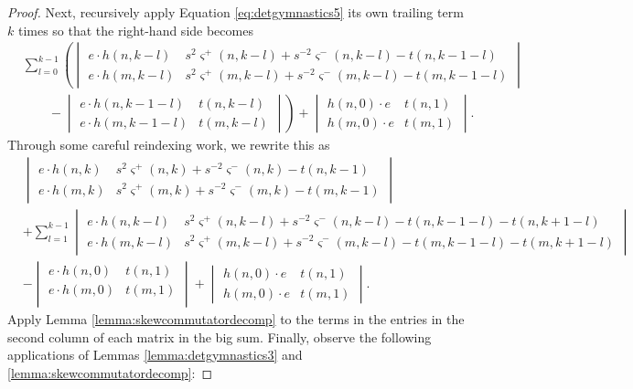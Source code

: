 \begin{proof}
Next, recursively apply Equation \ref{eq:detgymnastics5} its own trailing term $k$ times so that the right-hand side becomes
\begin{align*}
&\sum_{l=0}^{k-1} \left(
\begin{vmatrix}
e \cdot h(n, k-l) & s^2 \varsigma^+ (n, k-l) + s^{-2} \varsigma^- (n, k-l) - t(n, k-1-l) \\
e \cdot h(m, k-l) & s^2 \varsigma^+ (m, k-l) + s^{-2} \varsigma^- (m, k-l) - t(m, k-1-l)
\end{vmatrix} \right. \\
& \left. \qquad -
\begin{vmatrix}
e \cdot h(n, k-1-l) & t(n, k-l) \\
e \cdot h(m, k-1-l) & t(m, k-l)
\end{vmatrix} \right)
+
\begin{vmatrix}
h(n, 0) \cdot e & t(n, 1) \\
h(m, 0) \cdot e & t(m, 1)
\end{vmatrix}.
\end{align*}
Through some careful reindexing work, we rewrite this as
\begin{align*}
&\begin{vmatrix}
e \cdot h(n, k) & s^2 \varsigma^+ (n, k) + s^{-2} \varsigma^- (n, k) - t(n, k-1) \\
e \cdot h(m, k) & s^2 \varsigma^+ (m, k) + s^{-2} \varsigma^- (m, k) - t(m, k-1)
\end{vmatrix}\\
&+
\sum_{l=1}^{k-1}
\begin{vmatrix}
e \cdot h(n, k-l) & s^2 \varsigma^+ (n, k-l) + s^{-2} \varsigma^- (n, k-l) - t(n, k-1-l) - t(n, k+1-l)\\
e \cdot h(m, k-l) & s^2 \varsigma^+ (m, k-l) + s^{-2} \varsigma^- (m, k-l) - t(m, k-1-l) - t(m, k+1-l)
\end{vmatrix} \\
&-
\begin{vmatrix}
e \cdot h(n, 0) & t(n, 1) \\
e \cdot h(m, 0) & t(m, 1) \\
\end{vmatrix}
+
\begin{vmatrix}
h(n, 0) \cdot e & t(n, 1) \\
h(m, 0) \cdot e & t(m, 1)
\end{vmatrix}.
\end{align*}
Apply Lemma \ref{lemma:skewcommutatordecomp} to the terms in the entries in the second column of each matrix in the big sum. Finally, observe the following applications of Lemmas \ref{lemma:detgymnastics3} and  \ref{lemma:skewcommutatordecomp}:

\end{proof}
